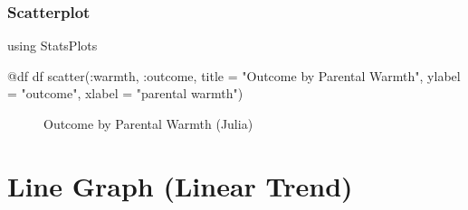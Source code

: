 \documentclass[
  letterpaper,
  DIV=11,
  numbers=noendperiod]{scrreprt}
\newenvironment{Shaded}{\begin{snugshade}}{\end{snugshade}}
\newcommand{\BuiltInTok}[1]{\textcolor[rgb]{0.00,0.23,0.31}{#1}}
\newcommand{\FunctionTok}[1]{\textcolor[rgb]{0.28,0.35,0.67}{#1}}
\newcommand{\ImportTok}[1]{\textcolor[rgb]{0.00,0.46,0.62}{#1}}
\newcommand{\NormalTok}[1]{\textcolor[rgb]{0.00,0.23,0.31}{#1}}
\newcommand{\OperatorTok}[1]{\textcolor[rgb]{0.37,0.37,0.37}{#1}}
\newcommand{\PreprocessorTok}[1]{\textcolor[rgb]{0.68,0.00,0.00}{#1}}
\newcommand{\StringTok}[1]{\textcolor[rgb]{0.13,0.47,0.30}{#1}}
\begin{document}
\subsubsection{Scatterplot}\label{scatterplot-2}

\begin{Shaded}
\begin{Highlighting}[]
\ImportTok{using} \BuiltInTok{StatsPlots}

\PreprocessorTok{@df}\NormalTok{ df }\FunctionTok{scatter}\NormalTok{(}\OperatorTok{:}\NormalTok{warmth, }\OperatorTok{:}\NormalTok{outcome, }
\NormalTok{               title }\OperatorTok{=} \StringTok{"Outcome by Parental Warmth"}\NormalTok{,}
\NormalTok{               ylabel }\OperatorTok{=} \StringTok{"outcome"}\NormalTok{,}
\NormalTok{               xlabel }\OperatorTok{=} \StringTok{"parental warmth"}\NormalTok{)}
\end{Highlighting}
\end{Shaded}

\begin{figure}[H]


\caption{\label{fig-Julia}Outcome by Parental Warmth (Julia)}

\end{figure}%

\section{Line Graph (Linear Trend)}\label{line-graph-linear-trend}
\end{document}
